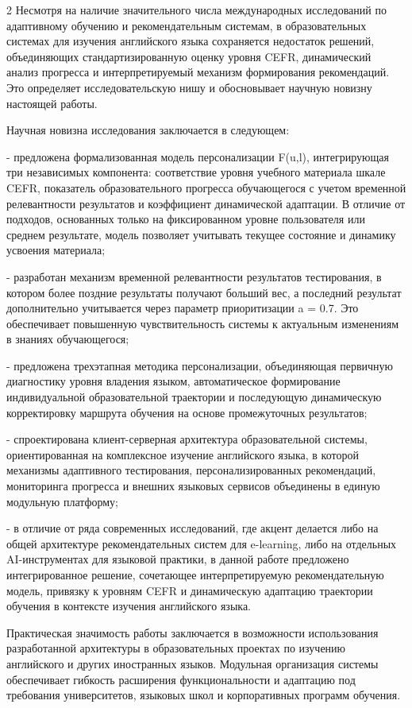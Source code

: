 \begin{multicols}{2}
Несмотря на наличие значительного числа международных исследований по
адаптивному обучению и рекомендательным системам, в образовательных
системах для изучения английского языка сохраняется недостаток решений,
объединяющих стандартизированную оценку уровня CEFR, динамический анализ
прогресса и интерпретируемый механизм формирования рекомендаций. Это
определяет исследовательскую нишу и обосновывает научную новизну
настоящей работы.

Научная новизна исследования заключается в следующем:

- предложена формализованная модель персонализации F(u,l), интегрирующая
три независимых компонента: соответствие уровня учебного материала шкале
CEFR, показатель образовательного прогресса обучающегося с учетом
временной релевантности результатов и коэффициент динамической
адаптации. В отличие от подходов, основанных только на фиксированном
уровне пользователя или среднем результате, модель позволяет учитывать
текущее состояние и динамику усвоения материала;

- разработан механизм временной релевантности результатов тестирования,
в котором более поздние результаты получают больший вес, а последний
результат дополнительно учитывается через параметр приоритизации a =
0.7. Это обеспечивает повышенную чувствительность системы к актуальным
изменениям в знаниях обучающегося;

- предложена трехэтапная методика персонализации, объединяющая первичную
диагностику уровня владения языком, автоматическое формирование
индивидуальной образовательной траектории и последующую динамическую
корректировку маршрута обучения на основе промежуточных результатов;

- спроектирована клиент-серверная архитектура образовательной системы,
ориентированная на комплексное изучение английского языка, в которой
механизмы адаптивного тестирования, персонализированных рекомендаций,
мониторинга прогресса и внешних языковых сервисов объединены в единую
модульную платформу;

- в отличие от ряда современных исследований, где акцент делается либо
на общей архитектуре рекомендательных систем для e-learning, либо на
отдельных AI-инструментах для языковой практики, в данной работе
предложено интегрированное решение, сочетающее интерпретируемую
рекомендательную модель, привязку к уровням CEFR и динамическую
адаптацию траектории обучения в контексте изучения английского языка.

Практическая значимость работы заключается в возможности использования
разработанной архитектуры в образовательных проектах по изучению
английского и других иностранных языков. Модульная организация системы
обеспечивает гибкость расширения функциональности и адаптацию под
требования университетов, языковых школ и корпоративных программ
обучения.


\end{multicols}
